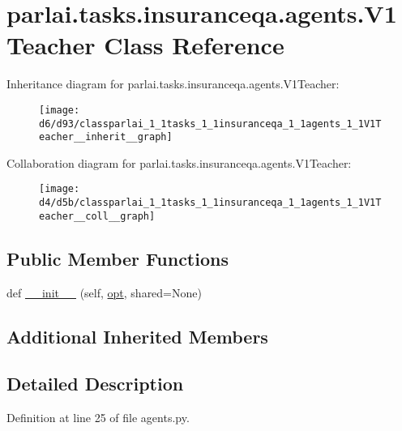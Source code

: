 \hypertarget{classparlai_1_1tasks_1_1insuranceqa_1_1agents_1_1V1Teacher}{}\section{parlai.\+tasks.\+insuranceqa.\+agents.\+V1\+Teacher Class Reference}
\label{classparlai_1_1tasks_1_1insuranceqa_1_1agents_1_1V1Teacher}


Inheritance diagram for parlai.\+tasks.\+insuranceqa.\+agents.\+V1\+Teacher\+:\nopagebreak
\begin{figure}[H]
\begin{center}
\leavevmode
\texttt{[image: d6/d93/classparlai\_1\_1tasks\_1\_1insuranceqa\_1\_1agents\_1\_1V1Teacher\_\_inherit\_\_graph]}
\end{center}
\end{figure}


Collaboration diagram for parlai.\+tasks.\+insuranceqa.\+agents.\+V1\+Teacher\+:\nopagebreak
\begin{figure}[H]
\begin{center}
\leavevmode
\texttt{[image: d4/d5b/classparlai\_1\_1tasks\_1\_1insuranceqa\_1\_1agents\_1\_1V1Teacher\_\_coll\_\_graph]}
\end{center}
\end{figure}
\subsection*{Public Member Functions}
\begin{DoxyCompactItemize}
\item 
def \hyperlink{classparlai_1_1tasks_1_1insuranceqa_1_1agents_1_1V1Teacher_aa41a7ca1c1c437a0d1bb4bf93549446a}{\+\_\+\+\_\+init\+\_\+\+\_\+} (self, \hyperlink{classparlai_1_1core_1_1teachers_1_1FbDialogTeacher_af7a9ec497b9cd0292d7b8fa220da7c28}{opt}, shared=None)
\end{DoxyCompactItemize}
\subsection*{Additional Inherited Members}


\subsection{Detailed Description}


Definition at line 25 of file agents.\+py.



